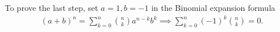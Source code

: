 To prove the last step, set $a=1,b=-1$ in the Binomial expansion formula
\begin{align*}
(a+b)^{n} = \sum_{k=0}^{n} \binom{n}{k} a^{n-k} b^{k}
\implies
\sum_{k=0}^{n} (-1)^{k}\binom{n}{k} = 0.
\end{align*}
